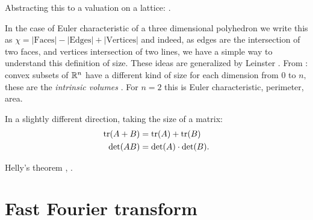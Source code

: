 \documentclass[11pt]{article}
\begin{document}
Abstracting this to a valuation on a lattice:
\cite{Klain1997}.

In the case of Euler characteristic of a three dimensional polyhedron
we write this as 
$\chi = |\mbox{Faces}| - |\mbox{Edges}| + |\mbox{Vertices}|$
and indeed, as edges are the intersection
of two faces, and vertices intersection of two lines,
we have a simple way to understand this definition of size.
These ideas are generalized by Leinster \cite{Leinster2008,Leinster2013,Leinster2014}.
From \cite{Leinster2014}: convex subsets of $\mathbb R^n$ have
a different kind of size for each dimension from $0$ to $n,$
these are the \emph{intrinsic volumes} \cite{Klain1997}.
For $n=2$ this is Euler characteristic, perimeter, area.

In a slightly different direction,
taking the size of a matrix:
\begin{align*}
    \mbox{tr}(A+B) &= \mbox{tr}(A) + \mbox{tr}(B) \\
    \mbox{det}(AB) &= \mbox{det}(A) \cdot \mbox{det}(B).
\end{align*}


Helly's theorem \cite{Klain1997}, \cite{Ghrist2014}.




%
%

\section{Fast Fourier transform}

\end{document}

